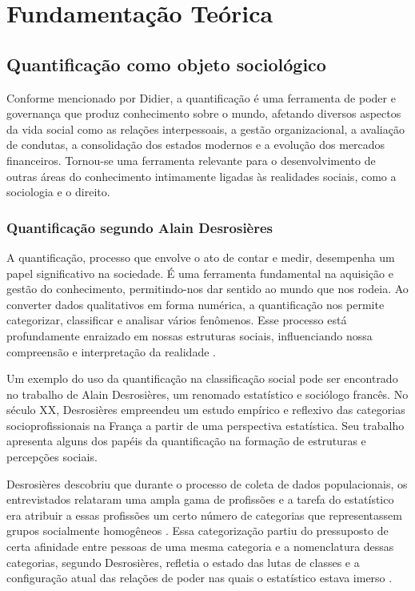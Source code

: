 
\chapter{Fundamentação Teórica}
\label{chap_fundamentacao_teorica}

\section{Quantificação como objeto sociológico}

Conforme mencionado por Didier, a quantificação é uma ferramenta de poder e governança que produz conhecimento sobre o mundo, afetando diversos aspectos da vida social como as relações interpessoais, a gestão organizacional, a avaliação de condutas, a consolidação dos estados modernos e a evolução dos mercados financeiros. Tornou-se uma ferramenta relevante para o desenvolvimento de outras áreas do conhecimento intimamente ligadas às realidades sociais, como a sociologia e o direito.

\subsection{Quantificação segundo Alain Desrosières}

A quantificação, processo que envolve o ato de contar e medir, desempenha um papel significativo na sociedade. É uma ferramenta fundamental na aquisição e gestão do conhecimento, permitindo-nos dar sentido ao mundo que nos rodeia. Ao converter dados qualitativos em forma numérica, a quantificação nos permite categorizar, classificar e analisar vários fenômenos. Esse processo está profundamente enraizado em nossas estruturas sociais, influenciando nossa compreensão e interpretação da realidade \cite{boltanski2011critique}.

Um exemplo do uso da quantificação na classificação social pode ser encontrado no trabalho de Alain Desrosières, um renomado estatístico e sociólogo francês. No século XX, Desrosières empreendeu um estudo empírico e reflexivo das categorias socioprofissionais na França a partir de uma perspectiva estatística. Seu trabalho apresenta alguns dos papéis da quantificação na formação de estruturas e percepções sociais.

Desrosières descobriu que durante o processo de coleta de dados populacionais, os entrevistados relataram uma ampla gama de profissões e a tarefa do estatístico era atribuir a essas profissões um certo número de categorias que representassem grupos socialmente homogêneos \cite{desrosieres2016quantification}. Essa categorização partiu do pressuposto de certa afinidade entre pessoas de uma mesma categoria e a nomenclatura dessas categorias, segundo Desrosières, refletia o estado das lutas de classes e a configuração atual das relações de poder nas quais o estatístico estava imerso \cite{camargo2009sociologia}.


